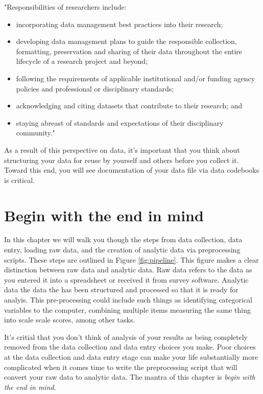 \documentclass[
]{krantz}
\providecommand{\tightlist}{%
  \setlength{\itemsep}{0pt}\setlength{\parskip}{0pt}}
\begin{document}
"Responsibilities of researchers include:

\begin{itemize}
\tightlist
\item
  incorporating data management best practices into their research;
\item
  developing data management plans to guide the responsible collection, formatting, preservation and sharing of their data throughout the entire lifecycle of a research project and beyond;
\item
  following the requirements of applicable institutional and/or funding agency policies and professional or disciplinary standards;
\item
  acknowledging and citing datasets that contribute to their research; and
\item
  staying abreast of standards and expectations of their disciplinary community."
\end{itemize}

As a result of this perspective on data, it's important that you think about structuring your data for reuse by yourself and others before you collect it. Toward this end, you will see documentation of your data file via data codebooks is critical.

\hypertarget{begin-with-the-end-in-mind}{%
\section{Begin with the end in mind}\label{begin-with-the-end-in-mind}}

In this chapter we will walk you though the steps from data collection, data entry, loading raw data, and the creation of analytic data via preprocessing scripts. These steps are outlined in Figure \ref{fig:pipeline}. This figure makes a clear distinction between raw data and analytic data. Raw data refers to the data as you entered it into a spreadsheet or received it from survey software. Analytic data the data the has been structured and processed so that it is ready for analyis. This pre-processing could include such things as identifying categorical variables to the computer, combining multiple items measuring the same thing into scale scale scores, among other tasks.

It's critial that you don't think of analysis of your results as being completely removed from the data collection and data entry choices you make. Poor choices at the data collection and data entry stage can make your life substantially more complicated when it comes time to write the preprocessing script that will convert your raw data to analytic data. The mantra of this chapter is \emph{begin with the end in mind}.
\end{document}

